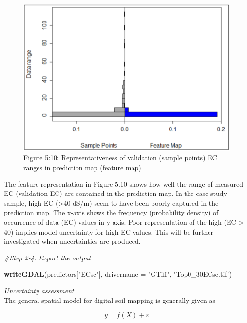 \documentclass[
  10pt,
  b5paper,
]{book}
\newenvironment{Shaded}{\begin{snugshade}}{\end{snugshade}}
\newcommand{\CommentTok}[1]{\textcolor[rgb]{0.56,0.35,0.01}{\textit{#1}}}
\newcommand{\DataTypeTok}[1]{\textcolor[rgb]{0.13,0.29,0.53}{#1}}
\newcommand{\KeywordTok}[1]{\textcolor[rgb]{0.13,0.29,0.53}{\textbf{#1}}}
\newcommand{\NormalTok}[1]{#1}
\newcommand{\StringTok}[1]{\textcolor[rgb]{0.31,0.60,0.02}{#1}}
\begin{document}
\begin{figure}
\centering
\includegraphics{figures/images/Figure5.10.PNG}
\caption{Figure 5:10: Representativeness of validation (sample points) EC ranges in prediction map (feature map)}
\end{figure}

The feature representation in Figure 5.10 shows how well the range of measured EC (validation EC) are contained in the prediction map. In the case-study sample, high EC (\textgreater40 dS/m) seem to have been poorly captured in the prediction map. The x-axis shows the frequency (probability density) of occurrence of data (EC) values in y-axis. Poor representation of the high (EC \textgreater{} 40) implies model uncertainty for high EC values. This will be further investigated when uncertainties are produced.

\begin{Shaded}
\begin{Highlighting}[]
\CommentTok{#Step 2-4: Export the output}

\KeywordTok{writeGDAL}\NormalTok{(predictors[}\StringTok{"ECse"}\NormalTok{], }\DataTypeTok{drivername =} \StringTok{"GTiff"}\NormalTok{, }\StringTok{"Top0_30ECse.tif"}\NormalTok{)}
\end{Highlighting}
\end{Shaded}

\emph{Uncertainty assessment}\\
The general spatial model for digital soil mapping is generally given as

\begin{equation}
\tag{5.5}
y = f(X) + \varepsilon
\end{equation}
\end{document}
